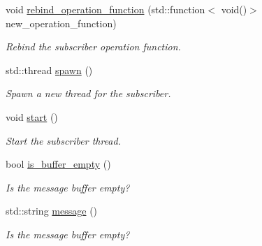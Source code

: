 \begin{DoxyCompactItemize}
void \hyperlink{classzcm_1_1Subscriber_a43497c10d058c40395b5541a20649816}{rebind\-\_\-operation\-\_\-function} (std\-::function$<$ void()$>$ new\-\_\-operation\-\_\-function)
\begin{DoxyCompactList}\small\item\em Rebind the subscriber operation function. \end{DoxyCompactList}\item 
std\-::thread \hyperlink{classzcm_1_1Subscriber_a05334a6b27ce47e46ad525c2fc015347}{spawn} ()
\begin{DoxyCompactList}\small\item\em Spawn a new thread for the subscriber. \end{DoxyCompactList}\item 
void \hyperlink{classzcm_1_1Subscriber_af255252bdc1808c7436208b919612a48}{start} ()
\begin{DoxyCompactList}\small\item\em Start the subscriber thread. \end{DoxyCompactList}\item 
bool \hyperlink{classzcm_1_1Subscriber_adabba1785e367df820f011fbdb2a52c2}{is\-\_\-buffer\-\_\-empty} ()
\begin{DoxyCompactList}\small\item\em Is the message buffer empty? \end{DoxyCompactList}\item 
std\-::string \hyperlink{classzcm_1_1Subscriber_a153a90da1c97e12da900d02b3726a207}{message} ()
\begin{DoxyCompactList}\small\item\em Is the message buffer empty? \end{DoxyCompactList}\end{DoxyCompactItemize}
